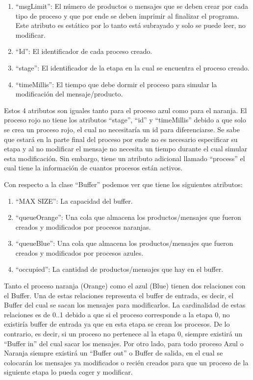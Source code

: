 \documentclass[a4paper]{article}
\begin{document}
    \begin{enumerate}
        \item “msgLimit”: El número de productos o mensajes que se deben crear por cada tipo de proceso y que por ende se deben imprimir al finalizar el programa. Este atributo es estático por lo tanto está subrayado y solo se puede leer, no modificar.  
        \item “Id”: El identificador de cada proceso creado. 
        \item “stage”: El identificador de la etapa en la cual se encuentra el proceso creado. 
        \item “timeMillis”: El tiempo que debe dormir el proceso para simular la modificación del mensaje/producto. 
    \end{enumerate}
    Estos 4 atributos son iguales tanto para el proceso azul como para el naranja. El proceso rojo no tiene los atributos “stage”, “id” y “timeMillis” debido a que solo se crea un proceso rojo, el cual no necesitaría un id para diferenciarse. Se sabe que estará en la parte final del proceso por ende no es necesario especificar su etapa y al no modificar el mensaje no necesita un tiempo durante el cual simular esta modificación. Sin embargo, tiene un atributo adicional llamado “process” el cual tiene la información de cuantos procesos están activos. 

    Con respecto a la clase “Buffer” podemos ver que tiene los siguientes atributos: 
    \begin{enumerate}
        \item “MAX SIZE”: La capacidad del buffer. 

        \item “queueOrange”: Una cola que almacena los productos/mensajes que fueron creados y modificados por procesos naranjas. 
        
        \item “queueBlue”: Una cola que almacena los productos/mensajes que fueron creados y modificados por procesos azules. 
        
        \item “occupied”: La cantidad de productos/mensajes que hay en el buffer. 
    \end{enumerate}
     

    Tanto el proceso naranja (Orange) como el azul (Blue) tienen dos relaciones con el Buffer. Una de estas relaciones representa el buffer de entrada, es decir, el Buffer del cual se sacan los mensajes para modificarlos. La cardinalidad de estas relaciones es de 0..1 debido a que si el proceso corresponde a la etapa 0, no existiría buffer de entrada ya que en esta etapa se crean los procesos. De lo contrario, es decir, si un proceso no pertenece al la etapa 0, siempre existirá un “Buffer in” del cual sacar los mensajes. Por otro lado, para todo proceso Azul o Naranja siempre existirá un “Buffer out” o Buffer de salida, en el cual se colocarán los mensajes ya modificados o recién creados para que un proceso de la siguiente etapa lo pueda coger y modificar. 
\end{document}
